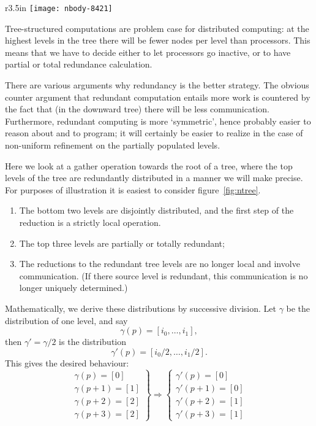 \documentclass[11pt,fleqn,preprint]{impreport}
\begin{document}
\begin{wrapfigure}{r}{3.5in}
  \texttt{[image: nbody-8421]}
  \caption{Distributed structure of a tree with 16 leaves on 8 processors.}
  \label{fig:ntree}
\end{wrapfigure}
%
Tree-structured computations are problem case for distributed computing:
at the highest levels in the tree there will be fewer nodes per level than processors.
This means that we have to decide either
to let processors go inactive, or
to have partial or total redundance calculation.

There are various arguments why redundancy is the better strategy.
The obvious counter argument that redundant computation entails more work
is countered by the fact that (in the downward tree) there will be less communication.
Furthermore, redundant computing is more `symmetric', hence probably easier to
  reason about and to program; it will certainly be easier to realize
in the case of non-uniform refinement on the partially populated levels.

Here we look at a gather operation towards the root of a tree,
where the top levels of the tree are redundantly distributed in a manner we will
make precise. For purposes of illustration it is easiest to consider
figure~\ref{fig:ntree}.
\begin{enumerate}
\item The bottom two levels are disjointly distributed,
  and the first step of the reduction is a strictly local operation.
\item The top three levels are partially or totally redundant;
\item The reductions to the redundant tree levels are no longer local
  and involve communication. (If there source level is redundant,
  this communication is no longer uniquely determined.)
\end{enumerate}

Mathematically, we derive these distributions by successive division.
Let $\gamma$ be the distribution of one level, and say
\[ \gamma(p) = [ i_0,\ldots,i_1 ], \]
then $\gamma'=\gamma/2$ is the distribution
\[ \gamma'(p) = [ i_0/2,\ldots,i_1/2 ]. \]
This gives the desired behaviour:
\[ \left. 
\begin{array}{c} \gamma(p) = [0]\\ \gamma(p+1)=[1]\\
  \gamma(p+2)=[2]\\ \gamma(p+3)=[2]
\end{array}
\right\} \Rightarrow \left\{
\begin{array}{c} \gamma'(p) = [0]\\ \gamma'(p+1)=[0]\\
  \gamma'(p+2)=[1]\\ \gamma'(p+3)=[1]
\end{array} \right.
\]
\end{document}

